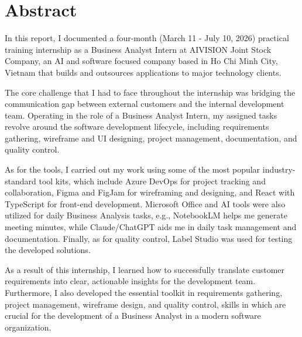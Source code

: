 \chapter*{Abstract}

In this report, I documented a four-month (March 11 - July 10, 2026) practical training internship as a Business Analyst Intern at AIVISION Joint Stock Company, an AI and software focused company based in Ho Chi Minh City, Vietnam that builds and outsources applications to major technology clients.

The core challenge that I had to face throughout the internship was bridging the communication gap between external customers and the internal development team. Operating in the role of a Business Analyst Intern, my assigned tasks revolve around the software development lifecycle, including requirements gathering, wireframe and UI designing, project management, documentation, and quality control.

As for the tools, I carried out my work using some of the most popular industry-standard tool kits, which include Azure DevOps for project tracking and collaboration, Figma and FigJam for wireframing and designing, and React with TypeScript for front-end development. Microsoft Office and AI tools were also utilized for daily Business Analysis tasks, e.g., NotebookLM helps me generate meeting minutes, while Claude/ChatGPT aids me in daily task management and documentation. Finally, as for quality control, Label Studio was used for testing the developed solutions.

As a result of this internship, I learned how to successfully translate customer requirements into clear, actionable insights for the development team. Furthermore, I also developed the essential toolkit in requirements gathering, project management, wireframe design, and quality control, skills in which are crucial for the development of a Business Analyst in a modern software organization.
